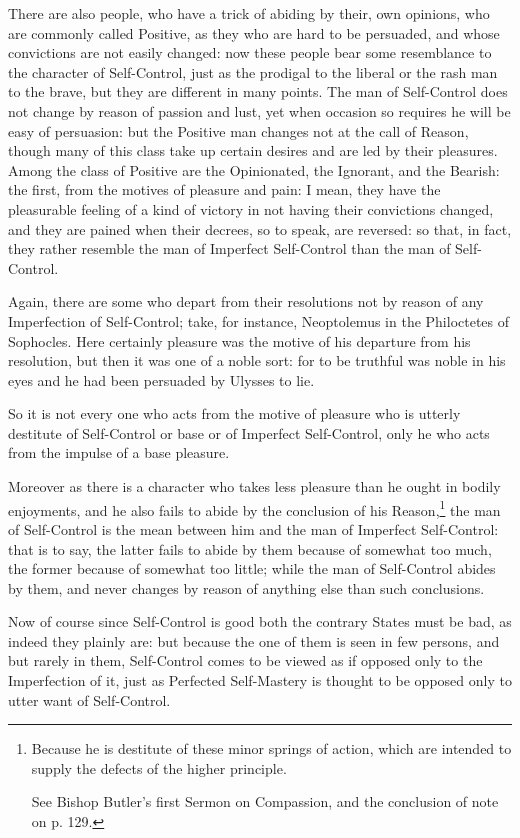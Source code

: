 There are also people, who have a trick of abiding by their, own opinions, who
are commonly called Positive, as they who are hard to be persuaded, and whose
convictions are not easily changed: now these people bear some resemblance to
the character of Self-Control, just as the prodigal to the liberal or the rash
man to the brave, but they are different in many points. The man of
Self-Control does not change by reason of passion and lust, yet when occasion
so requires he will be easy of persuasion: but the Positive man changes not at
the call of Reason, though many of this class take up certain desires and are
led by their pleasures. Among the class of Positive are the Opinionated, the
Ignorant, and the Bearish: the first, from the motives of pleasure and pain: I
mean, they have the pleasurable feeling of a kind of victory in not having
their convictions changed, and they are pained when their decrees, so to speak,
are reversed: so that, in fact, they rather resemble the man of Imperfect
Self-Control than the man of Self-Control.

Again, there are some who depart from their resolutions not by reason of any
Imperfection of Self-Control; take, for instance, Neoptolemus in the
Philoctetes of Sophocles. Here certainly pleasure was the motive of his
departure from his resolution, but then it was one of a noble sort: for to be
truthful was noble in his eyes and he had been persuaded by Ulysses to lie.

So it is not every one who acts from the motive of pleasure who is utterly
destitute of Self-Control or base or of Imperfect Self-Control, only he who
acts from the impulse of a base pleasure.


Moreover as there is a character who takes less pleasure than he ought in
bodily enjoyments, and he also fails to abide by the conclusion of his
Reason,\footnote{Because he is destitute of these minor springs of action, which are intended to
supply the defects of the higher principle.

See Bishop Butler’s first Sermon on Compassion, and the conclusion of
note on p. 129.}
the man of Self-Control is the mean between him and the man of Imperfect
Self-Control: that is to say, the latter fails to abide by them because of
somewhat too much, the former because of somewhat too little; while the man of
Self-Control abides by them, and never changes by reason of anything else than
such conclusions.

Now of course since Self-Control is good both the contrary States must be bad,
as indeed they plainly are: but because the one of them is seen in few persons,
and but rarely in them, Self-Control comes to be viewed as if opposed only to
the Imperfection of it, just as Perfected Self-Mastery is thought to be opposed
only to utter want of Self-Control.

